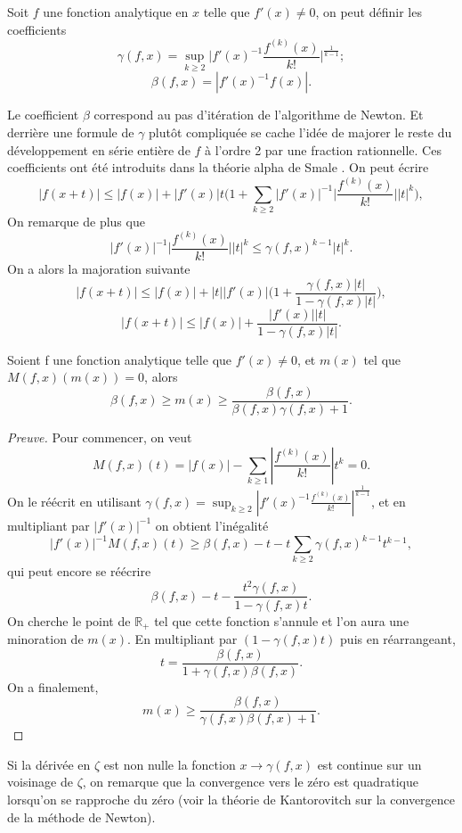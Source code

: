 \documentclass[a4paper,10pt]{article}
\begin{document}
	\begin{definition}
		Soit $f$ une fonction analytique en $x$ telle que $f'(x)\neq0$, on peut définir les coefficients 
		\[\gamma(f,x)=\sup_{k \geq 2}\Big|f'(x)^{-1}\frac{f^{(k)}(x)}{k!}\Big|^{\frac{1}{k-1}};\]
		\[\beta(f,x)=|f'(x)^{-1}f(x)|.\]
	\end{definition}
	Le coefficient $\beta$ correspond au pas d'itération de l'algorithme de Newton. 
	Et derrière une formule de $\gamma$ plutôt compliquée se cache l'idée de majorer le reste du développement en série entière de $f$ à l'ordre 2 par une fraction rationnelle. Ces coefficients ont été introduits dans la théorie alpha de Smale \cite{dedieu2006points}.
	On peut écrire 
	\[|f(x+t)|\leq |f(x)|+|f'(x)|t\Big(1+\sum_{k\geq2}|f'(x)|^{-1}\Big| \frac{f^{(k)}(x)}{k!}\Big||t|^k\Big),\]
	On remarque de plus que 
	\[|f'(x)|^{-1}\Big|\frac{f^{(k)}(x)}{k!}\Big||t|^k \leq \gamma(f,x)^{k-1}|t|^k.\]
	On a alors la majoration suivante
	\[|f(x+t)|\leq |f(x)|+|t||f'(x)|\Big(1+\frac{\gamma(f,x) |t|}{1-\gamma(f,x) |t|}\Big),\]
	\[|f(x+t)|\leq |f(x)|+\frac{|f'(x)||t|}{1-\gamma(f,x) |t|}.\]
	\begin{proposition}
		Soient f une fonction analytique telle que $f'(x)\neq 0$, et $m(x)$ tel que $M(f,x)(m(x))=0$, alors
		\[\beta(f,x) \geq m(x)\geq\frac{\beta(f,x)}{\beta(f,x)\gamma(f,x)+1}.\]
	\end{proposition}
	\begin{proof}[Preuve]
		
		Pour commencer, on veut  
		\[M(f,x)(t)=|f(x)|-\sum_{k\geq1}|\frac{f^{(k)}(x)}{k!}|t^{k}=0.\]
		On le réécrit en utilisant $\gamma(f,x)=\sup_{k \geq 2}|f'(x)^{-1}\frac{f^{(k)}(x)}{k!}|^{\frac{1}{k-1}}$, et en multipliant par $|f'(x)|^{-1}$ on obtient l'inégalité
		\[|f'(x)|^{-1}M(f,x)(t)\geq \beta(f,x)-t-t\sum_{k\geq2}\gamma(f,x)^{k-1}t^{k-1},\]
		qui peut encore se réécrire
		\[\beta(f,x)-t-\frac{t^2\gamma(f,x)}{1-\gamma(f,x) t}.\]
		On cherche le point de $\mathbb{R}_+$ tel que cette fonction s'annule et l'on aura une minoration de $m(x)$. En multipliant par $(1-\gamma(f,x) t)$ puis en réarrangeant,
		\[t=\frac{\beta(f,x)}{1+\gamma(f,x) \beta(f,x)}.\]
		On a finalement,
		\[m(x)\geq\frac{\beta(f,x)}{\gamma(f,x) \beta(f,x)+1}.\]
	\end{proof}
	Si la dérivée en $\zeta$ est non nulle la fonction $x\rightarrow \gamma(f,x)$ est continue sur un voisinage de $\zeta$, on remarque que la convergence vers le zéro est quadratique lorsqu'on se rapproche du zéro (voir la théorie de Kantorovitch \cite{dedieu2006points} sur la convergence de la méthode de Newton).
	
\end{document}
